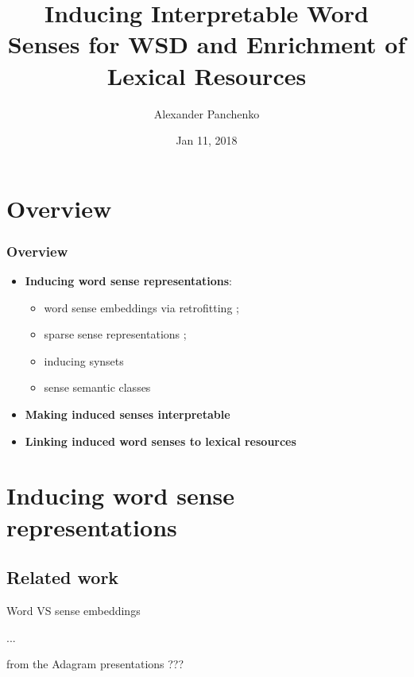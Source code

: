 \documentclass[usenames,dvipsnames]{beamer}
\title{Inducing Interpretable Word Senses for WSD and Enrichment of Lexical Resources}
\author{Alexander Panchenko} %
\date[11.02.2018]{Jan 11, 2018}
\begin{document}
\maketitle


\section{Overview}

\begin{frame}
  \frametitle{Overview}

  \begin{itemize}
		\item \textbf{Inducing word sense representations}:
		\begin{itemize}
		\item word sense embeddings via retrofitting \cite{pelevina-EtAl:2016:RepL4NLP,remus:2018};
		\item sparse sense representations \cite{panchenko-EtAl:2017:EACLlong};
		\item inducing synsets~\cite{ustalov-panchenko-biemann:2017:Long}
		\item sense semantic classes \cite{panchenko:2018:SemanticClasses} 
		\end{itemize}
		
	\pause 
	\vspace{1em}
	\item \textbf{Making induced senses interpretable} \cite{panchenko-EtAl:2017:EMNLP2017Demos,panchenko-EtAl:2017:EACLlong}
	
	\pause
	\vspace{1em}
	\item \textbf{Linking induced word senses to lexical resources}~\cite{faralli2016linked,panchenko-EtAl:2017:SENSE2017,biemann2018framework}	
			
\end{itemize}
	
\end{frame}

\section{Inducing word sense representations}


\subsection{Related work}

\begin{frame}{Word VS sense embeddings}

...

from the Adagram presentations ???
	
\end{frame}
\end{document}
